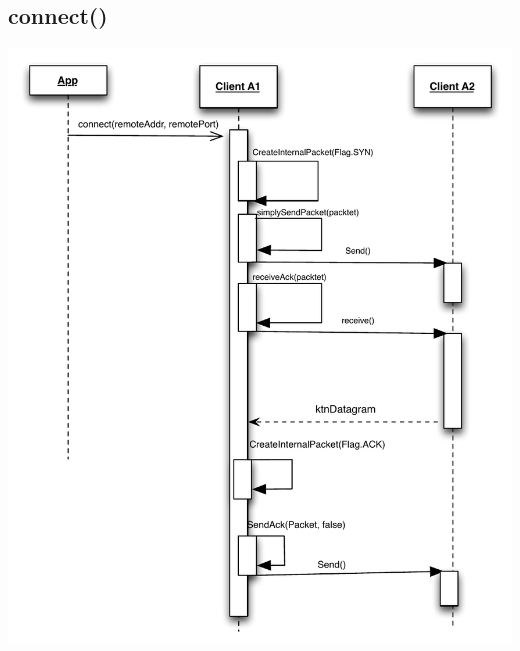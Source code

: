 \documentclass{article}
\begin{document}
\subsection{connect()}
\includegraphics[scale=0.8]{ktnConnect.pdf}
\end{document}
